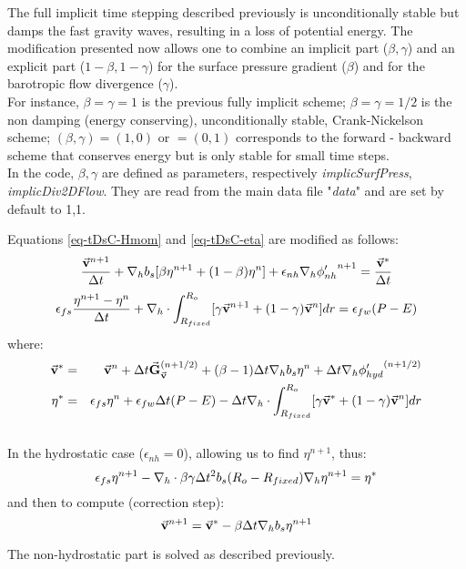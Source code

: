 The full implicit time stepping described previously is
unconditionally stable but damps the fast gravity waves, resulting in
a loss of potential energy.  The modification presented now allows one
to combine an implicit part ($\beta,\gamma$) and an explicit part
($1-\beta,1-\gamma$) for the surface pressure gradient ($\beta$) and
for the barotropic flow divergence ($\gamma$).
\\
For instance, $\beta=\gamma=1$ is the previous fully implicit scheme;
$\beta=\gamma=1/2$ is the non damping (energy conserving), unconditionally
stable, Crank-Nickelson scheme; $(\beta,\gamma)=(1,0)$ or $=(0,1)$
corresponds to the forward - backward scheme that conserves energy but is
only stable for small time steps.\\
In the code, $\beta,\gamma$ are defined as parameters, respectively 
{\it implicSurfPress}, {\it implicDiv2DFlow}. They are read from
the main data file "{\it data}" and are set by default to 1,1.

Equations \ref{eq-tDsC-Hmom} and \ref{eq-tDsC-eta} are modified as follows:
$$
\frac{ \vec{\bf v}^{n+1} }{ \Delta t }
+ {\bf \nabla}_h b_s [ \beta {\eta}^{n+1} + (1-\beta) {\eta}^{n} ] 
+ \epsilon_{nh} {\bf \nabla}_h {\phi'_{nh}}^{n+1}
 = \frac{ \vec{\bf v}^* }{ \Delta t }
$$
$$
\epsilon_{fs} \frac{ {\eta}^{n+1} - {\eta}^{n} }{ \Delta t}
+ {\bf \nabla}_h \cdot \int_{R_{fixed}}^{R_o} 
[ \gamma \vec{\bf v}^{n+1} + (1-\gamma) \vec{\bf v}^{n}] dr
= \epsilon_{fw} (P-E)
$$
where:
\begin{eqnarray*}
\vec{\bf v}^* & = &
\vec{\bf v} ^{n} + \Delta t \vec{\bf G}_{\vec{\bf v}} ^{(n+1/2)}
+ (\beta-1) \Delta t {\bf \nabla}_h b_s {\eta}^{n}
+ \Delta t {\bf \nabla}_h {\phi'_{hyd}}^{(n+1/2)}
\\
{\eta}^* & = &
\epsilon_{fs} {\eta}^{n} + \epsilon_{fw} \Delta t (P-E) 
- \Delta t {\bf \nabla}_h \cdot \int_{R_{fixed}}^{R_o} 
[ \gamma \vec{\bf v}^* + (1-\gamma) \vec{\bf v}^{n}] dr
\end{eqnarray*}
\\
In the hydrostatic case ($\epsilon_{nh}=0$), allowing us to find
${\eta}^{n+1}$, thus:
$$
\epsilon_{fs} {\eta}^{n+1} -
{\bf \nabla}_h \cdot \beta\gamma \Delta t^2 b_s (R_o - R_{fixed})
{\bf \nabla}_h {\eta}^{n+1}
= {\eta}^*
$$ 
and then to compute (correction step):
$$
\vec{\bf v}^{n+1} = \vec{\bf v}^{*}
- \beta \Delta t {\bf \nabla}_h b_s {\eta}^{n+1}
$$

The non-hydrostatic part is solved as described previously. 

